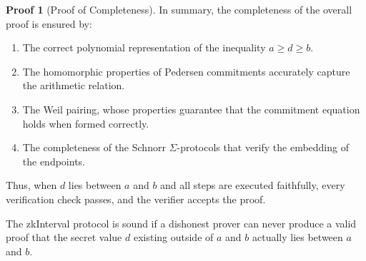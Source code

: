 \documentclass{iacrcc}
\theoremstyle{definition}
\newtheorem{namedproof}{Proof}
\begin{document}
\begin{namedproof}[Proof of Completeness]
  In summary, the completeness of the overall proof is ensured by:
  \begin{enumerate}
      \item The correct polynomial representation of the inequality \(a \geq d \geq b\).
      \item The homomorphic properties of Pedersen commitments accurately capture the arithmetic relation.
      \item The Weil pairing, whose properties guarantee that the commitment equation holds when formed correctly.
      \item The completeness of the Schnorr \(\Sigma\)-protocols that verify the embedding of the endpoints.
  \end{enumerate}
  Thus, when \(d\) lies between \(a\) and \(b\) and all steps are executed faithfully, every verification check passes, and the verifier accepts the proof.
\end{namedproof}

The zkInterval protocol is sound if a dishonest prover can never produce a valid proof that the secret value \( d \) existing outside of \( a \) and \( b \) actually lies between \( a \) and \( b \).
\end{document}
